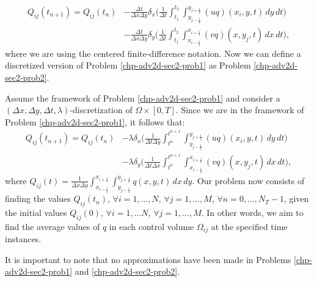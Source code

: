 \begin{align}
	\label{sec-adv2d:eq5}
	{Q}_{ij}(t_{n+1})  = {Q}_{ij}(t_{n})
	&- \frac{\Delta t}{\Delta x \Delta y}
	\delta _x \bigg( \frac{1}{\Delta t}
	\int_{t_1}^{t_2} \int_{y_{j-\frac{1}{2}}}^{y_{j+\frac{1}{2}}} 
	{(uq)}(x_{i}, y, t)
	\,dy \,dt \bigg) \\ \nonumber
	&- \frac{\Delta t}{\Delta x \Delta y}
	\delta _y \bigg( \frac{1}{\Delta t}
	\int_{t_1}^{t_2} \int_{x_{i-\frac{1}{2}}}^{x_{i+\frac{1}{2}}} 
	{(vq)}(x, y_{j}, t)
	\,dx \,dt \bigg),
\end{align}
where we are using the centered finite-difference notation.
Now we can define a discretized version of Problem \ref{chp-adv2d-sec2-prob1} as Problem \ref{chp-adv2d-sec2-prob2}.
\begin{prob}
	\label{chp-adv2d-sec2-prob2}
	Assume the framework of Problem \ref{chp-adv2d-sec2-prob1}
	and consider a $(\Delta x, \Delta y, \Delta t, \lambda)$-discretization of $\Omega\times [0,T]$.
	Since we are in the framework of Problem \ref{chp-adv2d-sec2-prob1}, it follows that:
	\begin{align*}
		{Q}_{ij}(t_{n+1})  = {Q}_{ij}(t_{n})
		&- {\lambda}
		\delta _x \bigg( \frac{1}{\Delta t \Delta y}
		\int_{t^n}^{t^{n+1}} \int_{y_{j-\frac{1}{2}}}^{y_{j+\frac{1}{2}}} 
		{(uq)}(x_{i}, y, t)
		\,dy \,dt \bigg) \\ \nonumber
		&- {\lambda}
		\delta _y \bigg( \frac{1}{\Delta t \Delta x}
		\int_{t^n}^{t^{n+1}} \int_{x_{i-\frac{1}{2}}}^{x_{i+\frac{1}{2}}} 
		{(vq)}(x, y_{j}, t)
		\,dx \,dt \bigg),
	\end{align*}
	where ${Q}_{ij}(t) = \frac{1}{\Delta x \Delta y}
	\int_{x_{i-\frac{1}{2}}}^{x_{i+\frac{1}{2}}} 
	\int_{y_{j-\frac{1}{2}}}^{y_{j+\frac{1}{2}}} {q}(x,y,t) \,dx \,dy$.
	Our problem now consists of finding the values ${Q}_{ij}(t_{n})$, 
	$\forall i = 1, \ldots, N$, $\forall j = 1, \ldots, M$, $\forall n = 0, \ldots, N_T-1$,
    given the initial values ${Q}_{ij}(0)$, $\forall i = 1, \ldots N$, $\forall j = 1, \ldots, M$.
    In other words, we aim to find the average values of ${q}$ in each control volume $\Omega_{ij}$ at the specified time instances.
\end{prob}
It is important to note that no approximations have been made in Problems \eqref{chp-adv2d-sec2-prob1} and \eqref{chp-adv2d-sec2-prob2}. 

